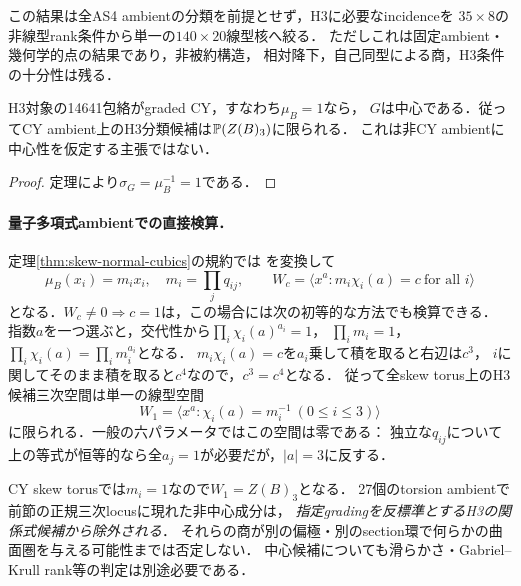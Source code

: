 この結果は全AS4 ambientの分類を前提とせず，H3に必要なincidenceを
$35\times8$の非線型rank条件から単一の$140\times20$線型核へ絞る．
ただしこれは固定ambient・幾何学的点の結果であり，非被約構造，
相対降下，自己同型による商，H3条件の十分性は残る．

\begin{corollary}[CY ambientでは三次関係が中心となる]
\label{cor:CY-cubic-central}
H3対象の14641包絡がgraded CY，すなわち$\mu_B=1$なら，
$G$は中心である．従ってCY ambient上のH3分類候補は$\mathbb P(Z(B)_3)$に限られる．
これは非CY ambientに中心性を仮定する主張ではない．
\end{corollary}
\begin{proof}
定理により$\sigma_G=\mu_B^{-1}=1$である．
\end{proof}

\paragraph{量子多項式ambientでの直接検算．}
定理\ref{thm:skew-normal-cubics}の規約では
\cite[Example 5.5]{RRZ}を変換して
\[
 \mu_B(x_i)=m_ix_i,\quad m_i=\prod_jq_{ij},\qquad
 W_c=\langle x^a:m_i\chi_i(a)=c\ \text{for all }i\rangle
\]
となる．$W_c\ne0\Rightarrow c=1$は，この場合には次の初等的な方法でも検算できる．
指数$a$を一つ選ぶと，交代性から$\prod_i\chi_i(a)^{a_i}=1$，
$\prod_im_i=1$，$\prod_i\chi_i(a)=\prod_im_i^{a_i}$となる．
$m_i\chi_i(a)=c$を$a_i$乗して積を取ると右辺は$c^3$，
$i$に関してそのまま積を取ると$c^4$なので，$c^3=c^4$となる．
従って全skew torus上のH3候補三次空間は単一の線型空間
\[
 W_1=\langle x^a:\chi_i(a)=m_i^{-1}\ (0\le i\le3)\rangle
\]
に限られる．一般の六パラメータではこの空間は零である：
独立な$q_{ij}$について上の等式が恒等的なら全$a_j=1$が必要だが，$|a|=3$に反する．

CY skew torusでは$m_i=1$なので$W_1=Z(B)_3$となる．
27個のtorsion ambientで前節の正規三次locusに現れた非中心成分は，
\emph{指定gradingを反標準とするH3の関係式候補から除外される}．
それらの商が別の偏極・別のsection環で何らかの曲面圏を与える可能性までは否定しない．
中心候補についても滑らかさ・Gabriel--Krull rank等の判定は別途必要である．

